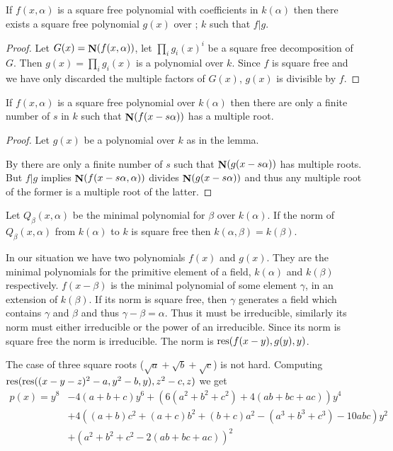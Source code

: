 \begin{lemma}
If $f(x,\alpha)$ is a square free polynomial with coefficients in
$k(\alpha)$ then there exists a square free polynomial $g(x)$ over      ;
$k$ such that $f | g$.  
\end{lemma}

\begin{proof}
Let $G(x)=\mathop{\mathbf{N}}\nolimits(f(x,\alpha))$, let $\prod_i g_i(x)^i$ be a square free
decomposition of $G$. Then $g(x)= \prod_i g_i(x)$ is a polynomial over
$k$.  Since $f$ is square free and we have only discarded the multiple
factors of $G(x)$, $g(x)$ is divisible by $f$.
\end{proof}


\begin{corollary} If $f(x,\alpha)$ is a square free polynomial over
$k(\alpha)$ then there are only a finite number of $s$ in $k$ such
that $\mathop{\mathbf{N}}\nolimits(f(x-s\alpha))$ has a multiple root.
\end{corollary}

\begin{proof}
Let $g(x)$ be a polynomial over $k$ as in the lemma.

By  there are only a finite number of $s$
such that $\mathop{\mathbf{N}}\nolimits(g(x-s\alpha))$ has multiple roots.  But $f | g$
implies $\mathop{\mathbf{N}}\nolimits(f(x-s\alpha,\alpha))$ divides $\mathop{\mathbf{N}}\nolimits(g(x-s\alpha))$ and
thus any multiple root of the former is a multiple root of the latter.
\end{proof}

\begin{proposition}
Let $Q_{\beta}(x, \alpha)$ be the minimal polynomial for $\beta$ over
$k(\alpha)$.  If the norm of $Q_{\beta}(x, \alpha)$ from $k(\alpha)$
to $k$ is square free then $k(\alpha, \beta) = k(\beta)$.
\end{proposition}

In our situation we have two polynomials $f(x)$ and $g(x)$.  They are
the minimal polynomials for the primitive element of a field,
$k(\alpha)$ and $k(\beta)$ respectively. $f(x-\beta)$ is the minimal
polynomial of some element $\gamma$, in an extension of $k(\beta)$.
If its norm is square free, then $\gamma$ generates a field which
contains $\gamma$ and $\beta$ and thus $\gamma - \beta = \alpha$.
 Thus it must be
irreducible, similarly its norm must either irreducible or the power
of an irreducible. Since its norm is square free the norm is
irreducible.  The norm is $\mathop{\rm res}\nolimits(f(x-y), g(y), y)$.

The case of three square roots ($\sqrt{a} + \sqrt{b} + \sqrt{c}$)
is not hard.  Computing $\mathop{\rm res}\nolimits(\mathop{\rm res}\nolimits((x-y-z)^2-a, y^2-b, y), z^2-c, z)$
we get
\[
\begin{aligned}
p(x) = y^8 &- 4 (a + b + c) y^6 + \left( 6 (a^2 + b^2 + c^2) +
4(a b + b c + a c)\right) y^4\\
&+ 4\left( (a + b) c^2 + (a + c) b^2 + (b + c) a^2 - (a^3 + b^3 + c^3) -
10 abc\right) y^2 \\
&+ \left( a^2 + b^2 + c^2 - 2 (a b + b c + a c)\right)^2
\end{aligned}
\]

